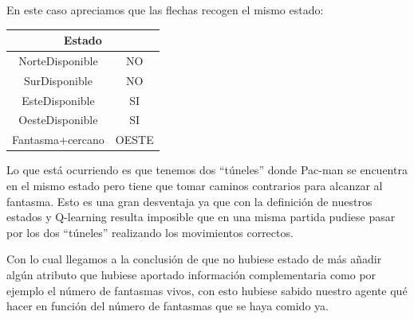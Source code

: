 \documentclass[11pt,a4paper]{article}
\begin{document}
En este caso apreciamos que las flechas recogen el mismo estado:

\begin{table}[H]
\centering
\label{EstadoEjemplo}
\begin{tabular}{|c|c|}
\hline
\multicolumn{2}{|c|}{\textbf{Estado}} \\ \hline
NorteDisponible & NO \\ \hline
SurDisponible & NO \\ \hline
EsteDisponible & SI \\ \hline
OesteDisponible & SI \\ \hline
Fantasma+cercano & OESTE \\ \hline
\end{tabular}
\end{table}

Lo que está ocurriendo es que tenemos dos “túneles” donde Pac-man se encuentra en el mismo estado pero tiene que tomar caminos contrarios para alcanzar al fantasma. Esto es una gran desventaja ya que con la definición de nuestros estados y Q-learning resulta imposible que en una misma partida pudiese pasar por los dos “túneles” realizando los movimientos correctos.

Con lo cual llegamos a la conclusión de que no hubiese estado de más añadir algún atributo que hubiese aportado información complementaria como por ejemplo el número de fantasmas vivos, con esto hubiese sabido nuestro agente qué hacer en función del número de fantasmas que se haya comido ya. 
\end{document}
